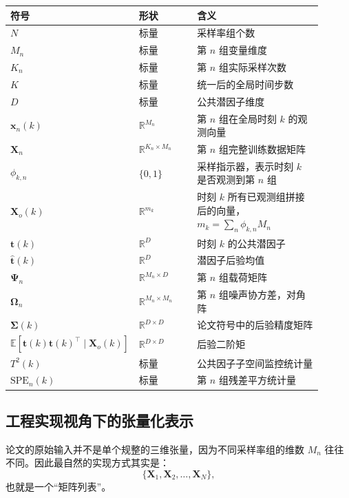 \documentclass[UTF8]{ctexart}
\begin{document}
\begin{longtable}{>{\raggedright\arraybackslash}p{0.18\linewidth} >{\raggedright\arraybackslash}p{0.22\linewidth} >{\raggedright\arraybackslash}p{0.50\linewidth}}
\toprule
符号 & 形状 & 含义 \\
\midrule
\endhead
$N$ & 标量 & 采样率组个数 \\
$M_n$ & 标量 & 第 $n$ 组变量维度 \\
$K_n$ & 标量 & 第 $n$ 组实际采样次数 \\
$K$ & 标量 & 统一后的全局时间步数 \\
$D$ & 标量 & 公共潜因子维度 \\
$\bm{x}_n(k)$ & $\mathbb{R}^{M_n}$ & 第 $n$ 组在全局时刻 $k$ 的观测向量 \\
$\bm{X}_n$ & $\mathbb{R}^{K_n \times M_n}$ & 第 $n$ 组完整训练数据矩阵 \\
$\phi_{k,n}$ & $\{0,1\}$ & 采样指示器，表示时刻 $k$ 是否观测到第 $n$ 组 \\
$\bm{X}_o(k)$ & $\mathbb{R}^{m_k}$ & 时刻 $k$ 所有已观测组拼接后的向量，$m_k=\sum_n \phi_{k,n}M_n$ \\
$\bm{t}(k)$ & $\mathbb{R}^{D}$ & 时刻 $k$ 的公共潜因子 \\
$\hat{\bm{t}}(k)$ & $\mathbb{R}^{D}$ & 潜因子后验均值 \\
$\bm{\Psi}_n$ & $\mathbb{R}^{M_n \times D}$ & 第 $n$ 组载荷矩阵 \\
$\bm{\Omega}_n$ & $\mathbb{R}^{M_n \times M_n}$ & 第 $n$ 组噪声协方差，对角阵 \\
$\bm{\Sigma}(k)$ & $\mathbb{R}^{D \times D}$ & 论文符号中的后验精度矩阵 \\
$\mathbb{E}[\bm{t}(k)\bm{t}(k)^\top \mid \bm{X}_o(k)]$ & $\mathbb{R}^{D \times D}$ & 后验二阶矩 \\
$T^2(k)$ & 标量 & 公共因子子空间监控统计量 \\
$\mathrm{SPE}_n(k)$ & 标量 & 第 $n$ 组残差平方统计量 \\
\bottomrule
\end{longtable}

\subsection{工程实现视角下的张量化表示}

论文的原始输入并不是单个规整的三维张量，因为不同采样率组的维数 $M_n$ 往往不同。因此最自然的实现方式其实是：
\begin{equation}
    \{\bm{X}_1,\bm{X}_2,\dots,\bm{X}_N\},
\end{equation}
也就是一个“矩阵列表”。
\end{document}
